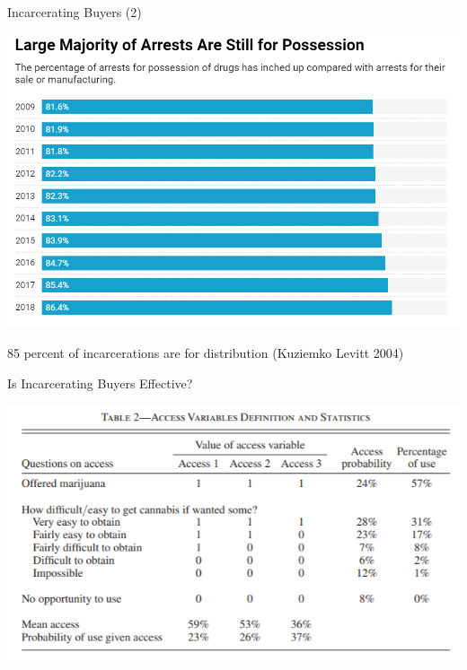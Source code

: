 \documentclass[10pt,ignorenonframetext,]{beamer}
\begin{document}
\begin{frame}{Incarcerating Buyers (2)}
\protect\hypertarget{incarcerating-buyers-2}{}

\includegraphics{Figure5.png}

85 percent of incarcerations are for distribution (Kuziemko Levitt 2004)

\end{frame}

\begin{frame}{Is Incarcerating Buyers Effective?}
\protect\hypertarget{is-incarcerating-buyers-effective}{}

\includegraphics{Figure6.png}

\end{frame}
\end{document}
